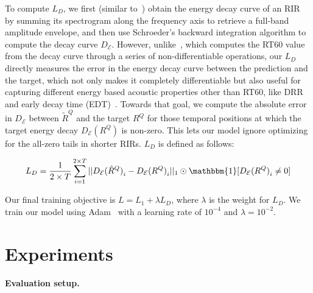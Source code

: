 To compute $L_D$, we first (similar to~\citep{singh2021image2reverb}) obtain the energy decay curve of an RIR by summing its spectrogram along the frequency axis to retrieve a full-band amplitude envelope, and then use Schroeder's backward integration algorithm to compute the decay curve $D_{\mathcal{E}}$. 
However, unlike~\citep{singh2021image2reverb}, which computes the RT60 value from the decay curve through a series of non-differentiable operations, our $L_D$ directly measures the error in the energy decay curve between the prediction and the target, which not only makes it completely differentiable but also useful for capturing different energy based acoustic properties other than RT60, like DRR and early decay time (EDT)~\citep{ratnarajah2021ts}. Towards that goal, we compute the absolute error in $D_{\mathcal{E}}$ between $\tilde{R}^Q$ and the target $R^Q$ for those temporal positions at which the target energy decay $D_{\mathcal{E}}(R^Q)$ is non-zero. This lets our model ignore optimizing for the all-zero tails in shorter RIRs. $L_D$ is defined as follows:

\begin{align*}
    L_D = \frac{1}{2 \times T}\sum_{i=1}^{2 \times T}||{D_{\mathcal{E}}(\tilde{R}^Q)}_i - {D_{\mathcal{E}}(R^Q)}_i||_{1} \odot \mathbbm{1}[{D_{\mathcal{E}}(R^Q)}_i \neq 0]
\end{align*}

Our final training objective is $L = L_1 + \lambda L_D$, where $\lambda$ is the weight for $L_D$. We train our model using Adam~\citep{kingma2014adam} with a learning rate of $10^{-4}$ and $\lambda=10^{-2}$.

\section{Experiments}\label{sec:experiments}

\paragraph{Evaluation setup.}

